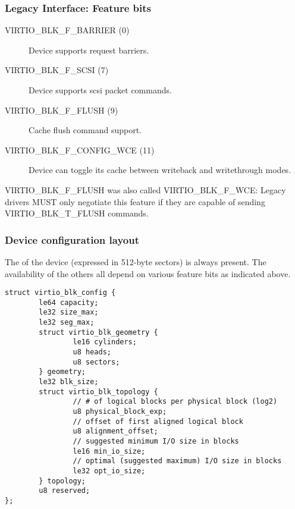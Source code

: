 \subsubsection{Legacy Interface: Feature bits}\label{sec:Device Types / Block Device / Feature bits / Legacy Interface: Feature bits}

\begin{description}
\item[VIRTIO_BLK_F_BARRIER (0)] Device supports request barriers.

\item[VIRTIO_BLK_F_SCSI (7)] Device supports scsi packet commands.

\item[VIRTIO_BLK_F_FLUSH (9)] Cache flush command support.

\item[VIRTIO_BLK_F_CONFIG_WCE (11)] Device can toggle its cache between writeback
    and writethrough modes.
\end{description}

VIRTIO_BLK_F_FLUSH was also called VIRTIO_BLK_F_WCE: Legacy drivers
MUST only negotiate this feature if they are capable of sending
VIRTIO_BLK_T_FLUSH commands.

\subsubsection{Device configuration layout}\label{sec:Device Types / Block Device / Feature bits / Device configuration layout}

The  of the device (expressed in 512-byte sectors) is always
present. The availability of the others all depend on various feature
bits as indicated above.

\begin{lstlisting}
struct virtio_blk_config {
        le64 capacity;
        le32 size_max;
        le32 seg_max;
        struct virtio_blk_geometry {
                le16 cylinders;
                u8 heads;
                u8 sectors;
        } geometry;
        le32 blk_size;
        struct virtio_blk_topology {
                // # of logical blocks per physical block (log2)
                u8 physical_block_exp;
                // offset of first aligned logical block
                u8 alignment_offset;
                // suggested minimum I/O size in blocks
                le16 min_io_size;
                // optimal (suggested maximum) I/O size in blocks
                le32 opt_io_size;
        } topology;
        u8 reserved;
};
\end{lstlisting}


